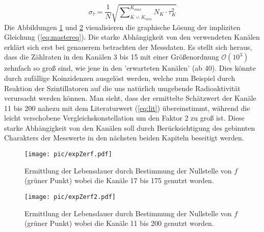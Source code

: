 		\begin{equation} 
			\sigma_{\hat{\tau}} = \frac{1}{N}\sqrt{\sum\nolimits_{K=K_{min}}^{K_{max}} N_K\cdot \tau_K^2}
		\end{equation}	
	Die Abbildungen \ref{fig:LDexpZerf1} und \ref{fig:LDexpZerf2} visualisieren die graphische Lösung der impliziten Gleichung (\ref{eq:mastereq}). Die starke Abhängigkeit von den verwendeten Kanälen erklärt sich erst bei genauerem betrachten der Messdaten. Es stellt sich heraus, dass die Zählraten in den Kanälen 3 bis 15  mit einer Größenordnung $\mathcal{O}(10^3)$ zehnfach so groß sind, wie jene in den 'erwarteten Kanälen' (ab 40). Dies könnte durch zufällige Koinzidenzen ausgelöst werden, welche zum Beispiel durch Reaktion der Szintillatoren auf die uns natürlich umgebende Radioaktivität verursacht werden können. Man sieht, dass der ermittelte Schätzwert der Kanäle 11 bis 200 nahezu mit dem Literaturwert (\ref{eq:lit}) übereinstimmt, während die leicht verschobene Vergleichskonstellation um den Faktor 2 zu groß ist. Diese starke Abhängigkeit von den Kanälen soll durch Berücksichtigung des gebinnten Charakters der Messwerte in den nächsten beiden Kapiteln beseitigt werden. \\
		\begin{figure}[Hp]
		    \centering
		    \captionsetup{justification=centering}
		    \texttt{[image: pic/expZerf.pdf]}
			\caption{Ermittlung der Lebensdauer durch Bestimmung der Nullstelle von $f$ (grüner Punkt) wobei die Kanäle 17 bis 175 genutzt worden.}
			\label{fig:LDexpZerf1}
		\end{figure}	
		
		\begin{figure}[Hp]
			\centering
			\captionsetup{justification=centering}
		    \texttt{[image: pic/expZerf2.pdf]}
		    \caption{Ermittlung der Lebensdauer durch Bestimmung der Nullstelle von $f$ (grüner Punkt) wobei die Kanäle 11 bis 200 genutzt worden.}
		    \label{fig:LDexpZerf2}
		\end{figure}
			
